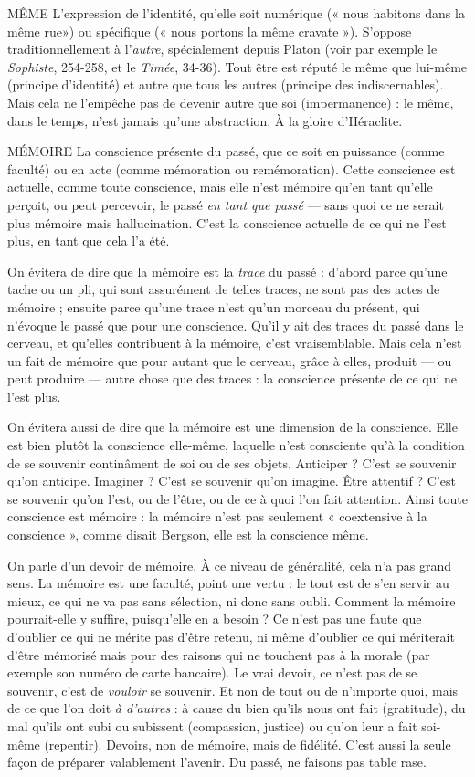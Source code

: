 MÊME L'expression de l'identité, qu’elle soit numérique (« nous habitons
dans la même rue») ou spécifique (« nous portons la même
cravate »). S’oppose traditionnellement à l’{\it autre}, spécialement depuis Platon
(voir par exemple le {\it Sophiste}, 254-258, et le {\it Timée}, 34-36). Tout être est réputé
le même que lui-même (principe d’identité) et autre que tous les autres (principe
des indiscernables). Mais cela ne l'empêche pas de devenir autre que soi
(impermanence) : le même, dans le temps, n’est jamais qu’une abstraction. À la
gloire d'Héraclite.

MÉMOIRE La conscience présente du passé, que ce soit en puissance (comme
faculté) ou en acte (comme mémoration ou remémoration).
Cette conscience est actuelle, comme toute conscience, mais elle n’est mémoire
qu’en tant qu’elle perçoit, ou peut percevoir, le passé {\it en tant que passé} — sans
quoi ce ne serait plus mémoire mais hallucination. C’est la conscience actuelle
de ce qui ne l’est plus, en tant que cela l’a été.

On évitera de dire que la mémoire est la {\it trace} du passé : d’abord parce
qu’une tache ou un pli, qui sont assurément de telles traces, ne sont pas des
actes de mémoire ; ensuite parce qu’une trace n’est qu’un morceau du présent,
qui n’évoque le passé que pour une conscience. Qu'il y ait des traces du passé
dans le cerveau, et qu’elles contribuent à la mémoire, c’est vraisemblable. Mais
cela n’est un fait de mémoire que pour autant que le cerveau, grâce à elles, produit
 — ou peut produire — autre chose que des traces : la conscience présente de
ce qui ne l’est plus.

On évitera aussi de dire que la mémoire est une dimension de la conscience.
Elle est bien plutôt la conscience elle-même, laquelle n’est consciente
qu'à la condition de se souvenir continâment de soi ou de ses objets.
Anticiper ? C’est se souvenir qu’on anticipe. Imaginer ? C’est se souvenir qu’on
imagine. Être attentif ? C’est se souvenir qu’on l’est, ou de l'être, ou de ce à
quoi l’on fait attention. Ainsi toute conscience est mémoire : la mémoire n’est
pas seulement « coextensive à la conscience », comme disait Bergson, elle est la
conscience même.

On parle d’un devoir de mémoire. À ce niveau de généralité, cela n’a pas
grand sens. La mémoire est une faculté, point une vertu : le tout est de s’en
servir au mieux, ce qui ne va pas sans sélection, ni donc sans oubli. Comment
la mémoire pourrait-elle y suffire, puisqu’elle en a besoin ? Ce n’est pas une
faute que d’oublier ce qui ne mérite pas d’être retenu, ni même d’oublier ce qui
mériterait d’être mémorisé mais pour des raisons qui ne touchent pas à la
morale (par exemple son numéro de carte bancaire). Le vrai devoir, ce n’est pas
de se souvenir, c’est de {\it vouloir} se souvenir. Et non de tout ou de n’importe
quoi, mais de ce que l’on doit {\it à d'autres} : à cause du bien qu’ils nous ont fait
(gratitude), du mal qu’ils ont subi ou subissent (compassion, justice) ou qu’on
leur a fait soi-même (repentir). Devoirs, non de mémoire, mais de fidélité.
C’est aussi la seule façon de préparer valablement l’avenir. Du passé, ne faisons
pas table rase.

